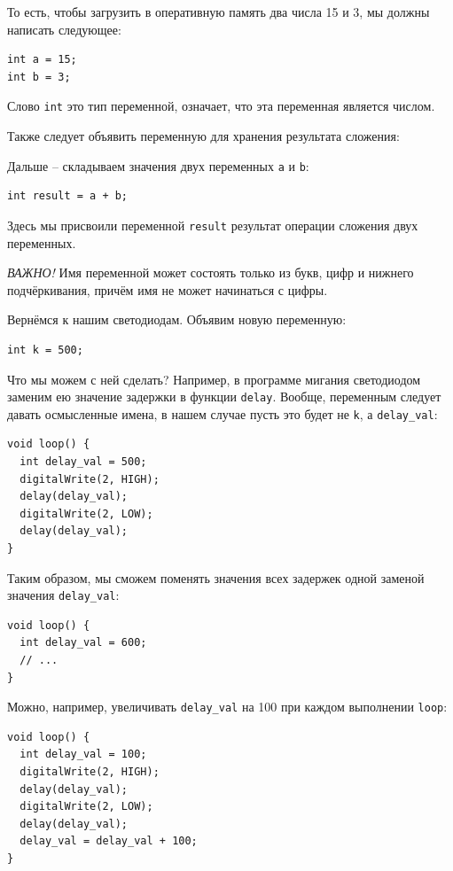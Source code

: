 \documentclass[a4paper,twoside]{book}
\begin{document}
То есть, чтобы загрузить в оперативную память два числа 15 и 3, мы должны написать
следующее:

\begin{verbatim}
int a = 15;
int b = 3;
\end{verbatim}

Слово \texttt{int} это тип переменной, означает, что эта переменная является
числом.

Также следует объявить переменную для хранения результата сложения:

Дальше -- складываем значения двух переменных \texttt{a} и \texttt{b}:

\begin{verbatim}
int result = a + b;
\end{verbatim}

Здесь мы присвоили переменной \texttt{result} результат операции сложения двух
переменных.

\emph{ВАЖНО!} Имя переменной может состоять только из букв, цифр и нижнего
подчёркивания, причём имя не может начинаться с цифры.

Вернёмся к нашим светодиодам. Объявим новую переменную:

\begin{verbatim}
int k = 500;
\end{verbatim}

Что мы можем с ней сделать? Например, в программе мигания светодиодом заменим ею
значение задержки в функции \texttt{delay}. Вообще, переменным следует давать
осмысленные имена, в нашем случае пусть это будет не \texttt{k}, а
\texttt{delay\_val}:

\begin{verbatim}
void loop() {
  int delay_val = 500;
  digitalWrite(2, HIGH);
  delay(delay_val);
  digitalWrite(2, LOW);
  delay(delay_val);
}
\end{verbatim}

Таким образом, мы сможем поменять значения всех задержек одной заменой значения
\texttt{delay\_val}:

\begin{verbatim}
void loop() {
  int delay_val = 600;
  // ...
}
\end{verbatim}

Можно, например, увеличивать \texttt{delay\_val} на 100 при каждом выполнении
\texttt{loop}:

\begin{verbatim}
void loop() {
  int delay_val = 100;
  digitalWrite(2, HIGH);
  delay(delay_val);
  digitalWrite(2, LOW);
  delay(delay_val);
  delay_val = delay_val + 100;
}
\end{verbatim}
\end{document}

